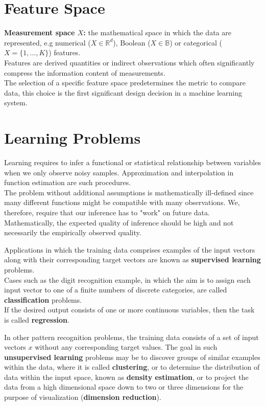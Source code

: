 \documentclass[twoside]{article}
\begin{document}
\section{Feature Space}

\textbf{Measurement space $X$:} the mathematical space in which the data are represented, e.g numerical ($X \in \mathbb{R}^d$), Boolean ($X \in \mathbb{B}$) or categorical ($X = \{1, ..., K\}$) features.\\
Features are derived quantities or indirect observations which often significantly compress the information content of measurements.\\
The selection of a specific feature space predetermines the metric to compare data, this choice is the first significant design decision in a machine learning system.

\newpage

\section{Learning Problems}

Learning requires to infer a functional or statistical relationship between variables when we only observe noisy samples.
Approximation and interpolation in function estimation are such procedures. \\
The problem without additional assumptions is mathematically ill-defined since many different functions might be compatible with many observations. We, therefore, require that our inference has to "work" on future data.
Mathematically, the expected quality of inference should be high and not necessarily the empirically observed quality.\medskip

Applications in which the training data comprises examples of the input vectors along with their corresponding target vectors are known as \textbf{supervised learning} problems.\\
Cases such as the digit recognition example, in which the aim is to assign each input vector to one of a finite numbers of discrete categories, are called \textbf{classification} problems.\\
If the desired output consists of one or more continuous variables, then the task is called \textbf{regression}.\medskip

In other pattern recognition problems, the training data consists of a set of input vectors $x$ without any corresponding target values. The goal in such \textbf{unsupervised learning} problems may be to discover groups of similar examples within the data, where it is called \textbf{clustering}, or to determine the distribution of data within the input space, known as \textbf{density estimation}, or to project the data from a high dimensional space down to two or three dimensions for the purpose of visualization (\textbf{dimension reduction}).\medskip
\end{document}
